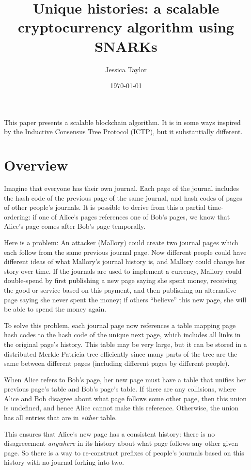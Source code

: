 \documentclass{article}
\title{Unique histories: a scalable cryptocurrency algorithm using SNARKs}
\date{\today}
\author{Jessica Taylor}
\begin{document}
\maketitle

This paper presents a scalable blockchain algorithm.  It is in some ways inspired by the Inductive Consensus Tree Protocol (ICTP), but it substantially different.

\section{Overview}

Imagine that everyone has their own journal.  Each page of the journal includes the hash code of the previous page of the same journal, and hash codes of pages of other people's journals.  It is possible to derive from this a partial time-ordering: if one of Alice's pages references one of Bob's pages, we know that Alice's page comes after Bob's page temporally.

Here is a problem: An attacker (Mallory) could create two journal pages which each follow from the same previous journal page.  Now different people could have different ideas of what Mallory's journal history is, and Mallory could change her story over time.  If the journals are used to implement a currency, Mallory could double-spend by first publishing a new page saying she spent money, receiving the good or service based on this payment, and then publishing an alternative page saying she never spent the money; if others ``believe'' this new page, she will be able to spend the money again.

To solve this problem, each journal page now references a table mapping page hash codes to the hash code of the unique next page, which includes all links in the original page's history.  This table may be very large, but it can be stored in a distributed Merkle Patricia tree efficiently since many parts of the tree are the same between different pages (including different pages by different people).

When Alice refers to Bob's page, her new page must have a table that unifies her previous page's table and Bob's page's table.  If there are any collisions, where Alice and Bob disagree about what page follows some other page, then this union is undefined, and hence Alice cannot make this reference.  Otherwise, the union has all entries that are in \emph{either} table.

This ensures that Alice's new page has a consistent history: there is no disagreeement \emph{anywhere} in its history about what page follows any other given page.  So there is a way to re-construct prefixes of people's journals based on this history with no journal forking into two.
\end{document}
